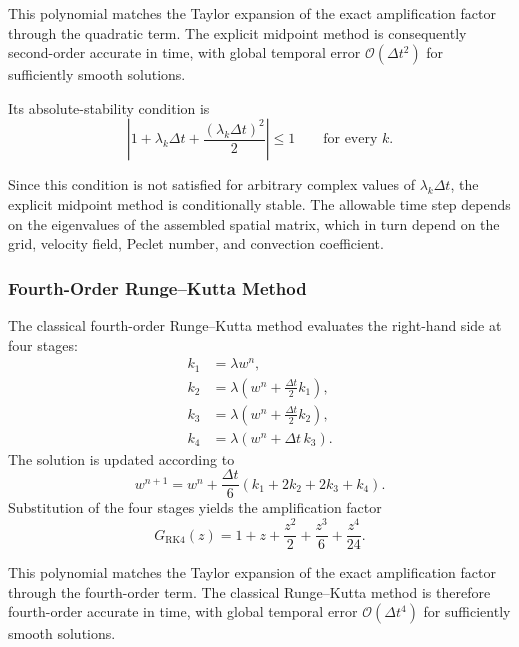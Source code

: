 This polynomial matches the Taylor expansion of the exact
amplification factor through the quadratic term. The
explicit midpoint method is consequently second-order
accurate in time, with global temporal error
$\mathcal{O}(\Delta t^2)$ for sufficiently smooth solutions.

Its absolute-stability condition is
\begin{equation}
\boxed{
\left|
1+\lambda_k\Delta t
+\frac{(\lambda_k\Delta t)^2}{2}
\right|
\leq 1
\qquad \text{for every } k.
}
\label{eq:rk2_stability}
\end{equation}

Since this condition is not satisfied for arbitrary complex
values of $\lambda_k\Delta t$, the explicit midpoint method
is conditionally stable. The allowable time step depends on
the eigenvalues of the assembled spatial matrix, which in
turn depend on the grid, velocity field, Peclet number,
and convection coefficient.

\subsubsection{Fourth-Order Runge--Kutta Method}

The classical fourth-order Runge--Kutta method evaluates
the right-hand side at four stages:
\begin{align}
k_1&=\lambda w^n,
\\
k_2&=\lambda\left(w^n+\frac{\Delta t}{2}k_1\right),
\\
k_3&=\lambda\left(w^n+\frac{\Delta t}{2}k_2\right),
\\
k_4&=\lambda\left(w^n+\Delta t\,k_3\right).
\end{align}
The solution is updated according to
\begin{equation}
w^{n+1}
=
w^n+\frac{\Delta t}{6}
\left(k_1+2k_2+2k_3+k_4\right).
\end{equation}
Substitution of the four stages yields the amplification
factor
\begin{equation}
\boxed{
G_{\mathrm{RK4}}(z)
=
1+z+\frac{z^2}{2}
+\frac{z^3}{6}
+\frac{z^4}{24}.
}
\label{eq:rk4_amplification}
\end{equation}

This polynomial matches the Taylor expansion of the exact
amplification factor through the fourth-order term.
The classical Runge--Kutta method is therefore fourth-order
accurate in time, with global temporal error
$\mathcal{O}(\Delta t^4)$ for sufficiently smooth solutions.

